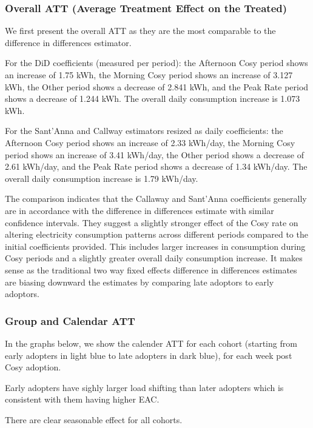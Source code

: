 \documentclass[
]{article}
\begin{document}
\subsubsection{Overall ATT (Average Treatment Effect on the Treated)}\label{overall-att-average-treatment-effect-on-the-treated}

We first present the overall ATT as they are the most comparable to the difference in differences estimator.

For the DiD coefficients (measured per period): the Afternoon Cosy period shows an increase of 1.75 kWh, the Morning Cosy period shows an increase of 3.127 kWh, the Other period shows a decrease of 2.841 kWh, and the Peak Rate period shows a decrease of 1.244 kWh. The overall daily consumption increase is 1.073 kWh.

For the Sant'Anna and Callway estimators resized as daily coefficients: the Afternoon Cosy period shows an increase of 2.33 kWh/day, the Morning Cosy period shows an increase of 3.41 kWh/day, the Other period shows a decrease of 2.61 kWh/day, and the Peak Rate period shows a decrease of 1.34 kWh/day. The overall daily consumption increase is 1.79 kWh/day.

The comparison indicates that the Callaway and Sant'Anna coefficients generally are in accordance with the difference in differences estimate with similar confidence intervals. They suggest a slightly stronger effect of the Cosy rate on altering electricity consumption patterns across different periods compared to the initial coefficients provided. This includes larger increases in consumption during Cosy periods and a slightly greater overall daily consumption increase. It makes sense as the traditional two way fixed effects difference in differences estimates are biasing downward the estimates by comparing late adoptors to early adoptors.

\subsubsection{Group and Calendar ATT}\label{group-and-calendar-att}

In the graphs below, we show the calender ATT for each cohort (starting from early adopters in light blue to late adopters in dark blue), for each week post Cosy adoption.

Early adopters have sighly larger load shifting than later adopters which is consistent with them having higher EAC.

There are clear seasonable effect for all cohorts.
\end{document}
